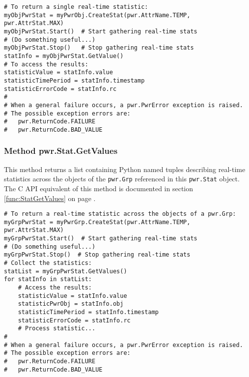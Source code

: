 \begin{center}\begin{minipage}{.95\linewidth}\begin{lstlisting}
# To return a single real-time statistic:
myObjPwrStat = myPwrObj.CreateStat(pwr.AttrName.TEMP, pwr.AttrStat.MAX)
myObjPwrStat.Start()  # Start gathering real-time stats
# (Do something useful...)
myObjPwrStat.Stop()   # Stop gathering real-time stats
statInfo = myObjPwrStat.GetValue()
# To access the results:
statisticValue = statInfo.value
statisticTimePeriod = statInfo.timestamp
statisticErrorCode = statInfo.rc
#
# When a general failure occurs, a pwr.PwrError exception is raised.
# The possible exception errors are:
#   pwr.ReturnCode.FAILURE
#   pwr.ReturnCode.BAD_VALUE
\end{lstlisting}\end{minipage}\end{center}

\subsubsection{Method pwr.Stat.GetValues} \label{meth:StatGetValues}

This method returns a list containing Python named tuples describing real-time statistics across
the objects of the \texttt{pwr.Grp} referenced in this \texttt{pwr.Stat} object.
The C API equivalent of this method is documented in section
\ref{func:StatGetValues} on page \pageref{func:StatGetValues}.

\begin{center}\begin{minipage}{.95\linewidth}\begin{lstlisting}
# To return a real-time statistic across the objects of a pwr.Grp:
myGrpPwrStat = myPwrGrp.CreateStat(pwr.AttrName.TEMP, pwr.AttrStat.MAX)
myGrpPwrStat.Start()  # Start gathering real-time stats
# (Do something useful...)
myGrpPwrStat.Stop()  # Stop gathering real-time stats
# Collect the statistics:
statList = myGrpPwrStat.GetValues()
for statInfo in statList:
    # Access the results:
    statisticValue = statInfo.value
    statisticPwrObj = statInfo.obj
    statisticTimePeriod = statInfo.timestamp
    statisticErrorCode = statInfo.rc
    # Process statistic...
#
# When a general failure occurs, a pwr.PwrError exception is raised.
# The possible exception errors are:
#   pwr.ReturnCode.FAILURE
#   pwr.ReturnCode.BAD_VALUE
\end{lstlisting}\end{minipage}\end{center}

